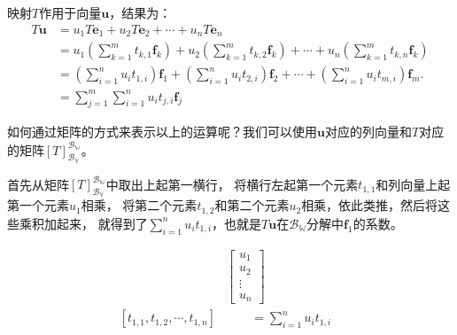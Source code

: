 \documentclass[12pt,UTF8]{ctexbook}
\begin{document}
映射$T$作用于向量$\mathbf{u}$，结果为：
\begin{align*}
    T\mathbf{u} &= u_1T\mathbf{e}_1 + u_2T\mathbf{e}_2 + \cdots + u_nT\mathbf{e}_n  \\
                &= u_1\left(\sum_{k=1}^m t_{k,1}\mathbf{f}_k\right) + u_2\left(\sum_{k=1}^m t_{k,2}\mathbf{f}_k\right) + \cdots + u_n \left(\sum_{k=1}^m t_{k,n}\mathbf{f}_k\right)  \\
                &= \left(\sum_{i=1}^n u_i t_{1,i}\right) \mathbf{f}_1 + \left(\sum_{i=1}^n u_i t_{2,i}\right) \mathbf{f}_2 + \cdots + \left(\sum_{i=1}^n u_i t_{m,i}\right) \mathbf{f}_m.  \\
                &= \sum_{j=1}^m \sum_{i=1}^n u_i t_{j,i} \mathbf{f}_j 
\end{align*} 

如何通过矩阵的方式来表示以上的运算呢？我们可以使用$\mathbf{u}$对应的列向量和$T$对应的矩阵$[T]_{\mathcal{B}_{\mathbb{V}}}^{\mathcal{B}_{\mathbb{W}}}$。

首先从矩阵$[T]_{\mathcal{B}_{\mathbb{V}}}^{\mathcal{B}_{\mathbb{W}}}$中取出上起第一横行，
将横行左起第一个元素$t_{1,1}$和列向量上起第一个元素$u_1$相乘，
将第二个元素$t_{1,2}$和第二个元素$u_2$相乘，依此类推，然后将这些乘积加起来，
就得到了$\sum_{i=1}^n u_i t_{1,i}$，也就是$T\mathbf{u}$在$\mathcal{B}_{\mathbb{W}}$分解中$\mathbf{f}_1$的系数。

\begin{align*}
& \begin{bmatrix}u_1\\u_2\\ \vdots \\u_n \end{bmatrix} & \\
   [t_{1,1}, t_{1,2} , \cdots , t_{1,n}] & \qquad = \sum_{i=1}^n u_i t_{1,i} 
\end{align*}
\end{document}
